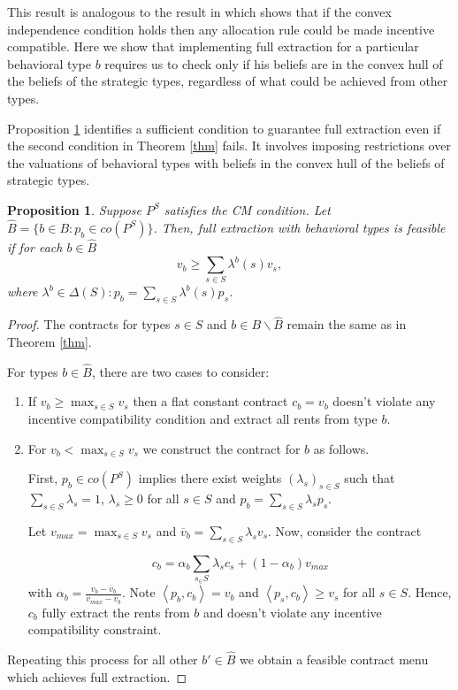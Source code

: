 \documentclass[12pt]{article}
\newtheorem{proposition}{Proposition}
\begin{document}
This result is analogous to the result in \citet{borgersbook} which shows that if the convex independence condition holds then any allocation rule could be made incentive compatible. Here we show that implementing full extraction for a particular behavioral type $b$ requires us to check only if his beliefs are in the convex hull of the beliefs of the strategic types, regardless of what could be achieved from other types.

Proposition \ref{prop} identifies a sufficient condition to guarantee full extraction even if the second condition in Theorem \ref{thm} fails. It involves imposing restrictions over the valuations of behavioral types with beliefs in the convex hull of the beliefs of strategic types.

\begin{proposition}\label{prop}
	Suppose $P^S$ satisfies the CM condition. Let $\hat{B}=\{b\in B: p_b\in co(P^S)\}$. Then, full extraction with behavioral types is feasible if for each $b\in\hat{B}$ %
	    \[
	     v_b\geq \sum_{s\in S} \lambda^b(s) v_s,
	    \]
	where $\lambda^b\in\Delta(S): p_b=\displaystyle\sum_{s\in S} \lambda^b(s) p_s$.
\end{proposition}

\begin{proof}
	The contracts for types $s\in S$ and $b\in B\backslash \hat{B}$ remain the same as in Theorem \ref{thm}.

	For types $b\in \hat{B}$, there are two cases to consider:

		\begin{enumerate}
			\item If $v_b\geq \max_{s\in S}v_s$ then a flat constant contract $c_b=v_b$ doesn't violate any incentive compatibility condition and extract all rents from type $b$. 

			\item For $v_b<\max_{s\in S} v_s$ we construct the contract for $b$ as follows. 

			First, $p_b\in co(P^S)$ implies there exist weights $(\lambda_s)_{s\in S}$ such that $\sum_{s\in S}
			\lambda_s=1$, $\lambda_s\geq 0$ for all $s\in S$ and $p_b=\sum_{s\in S} \lambda_sp_s$.

			Let $v_{max}=\max_{s\in S} v_s$ and $\overline{v}_b=\sum_{s\in S} \lambda_s v_s$.  Now, consider the contract

				\[
					c_b=\alpha_b\sum_{s_\in S} \lambda_s c_s +(1-\alpha_b) v_{max}
				\]
			with $\alpha_b=\frac{v_b-\overline{v}_b}{v_{max}- \overline{v}_b}$. Note $\left<p_b,c_b\right>=v_b$ and $\left<p_s,c_b\right>\geq v_s$ for all $s\in S$. Hence, $c_b$ fully extract the rents from $b$ and doesn't violate any incentive compatibility constraint. 
		\end{enumerate}
	Repeating this process for all other $b'\in \hat{B}$ we obtain a feasible contract menu which achieves full extraction.
\end{proof}
\end{document}
